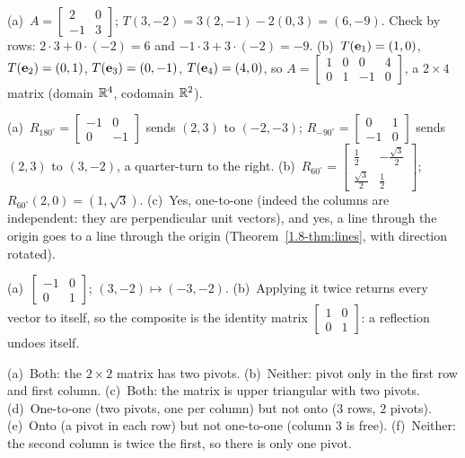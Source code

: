 \documentclass[11pt]{article}
\begin{document}
\begin{description}[leftmargin=0pt,itemsep=5pt]
  \item[Knowledge Check \ref{kc:matdata}.] (a)~$A=\begin{bmatrix}2&0\\-1&3\end{bmatrix}$; $T(3,-2)=3(2,-1)-2(0,3)=(6,-9)$. Check by rows: $2\cdot3+0\cdot(-2)=6$ and $-1\cdot3+3\cdot(-2)=-9$. (b)~$T(\mathbf{e}_1)=(1,0)$, $T(\mathbf{e}_2)=(0,1)$, $T(\mathbf{e}_3)=(0,-1)$, $T(\mathbf{e}_4)=(4,0)$, so $A=\begin{bmatrix}1&0&0&4\\0&1&-1&0\end{bmatrix}$, a $2\times4$ matrix (domain $\mathbb{R}^4$, codomain $\mathbb{R}^2$).
  \item[Knowledge Check \ref{kc:rot}.] (a)~$R_{180^\circ}=\begin{bmatrix}-1&0\\0&-1\end{bmatrix}$ sends $(2,3)$ to $(-2,-3)$; $R_{-90^\circ}=\begin{bmatrix}0&1\\-1&0\end{bmatrix}$ sends $(2,3)$ to $(3,-2)$, a quarter-turn to the right. (b)~$R_{60^\circ}=\begin{bmatrix}\tfrac12&-\tfrac{\sqrt3}{2}\\\tfrac{\sqrt3}{2}&\tfrac12\end{bmatrix}$; $R_{60^\circ}(2,0)=(1,\sqrt3)$. (c)~Yes, one-to-one (indeed the columns are independent: they are perpendicular unit vectors), and yes, a line through the origin goes to a line through the origin (Theorem~\ref{1.8-thm:lines}, with direction rotated).
  \item[Knowledge Check \ref{kc:reflect}.] (a)~$\begin{bmatrix}-1&0\\0&1\end{bmatrix}$; $(3,-2)\mapsto(-3,-2)$. (b)~Applying it twice returns every vector to itself, so the composite is the identity matrix $\begin{bmatrix}1&0\\0&1\end{bmatrix}$: a reflection undoes itself.
  \item[Knowledge Check \ref{kc:classify}.] (a)~Both: the $2\times2$ matrix has two pivots. (b)~Neither: pivot only in the first row and first column. (c)~Both: the matrix is upper triangular with two pivots. (d)~One-to-one (two pivots, one per column) but not onto ($3$ rows, $2$ pivots). (e)~Onto (a pivot in each row) but not one-to-one (column $3$ is free). (f)~Neither: the second column is twice the first, so there is only one pivot.

\end{description}
\end{document}
